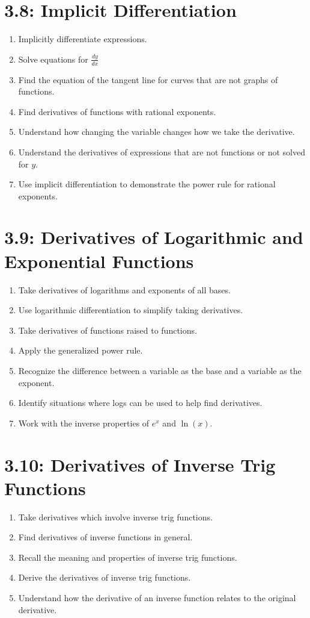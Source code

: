 \section*{3.8: Implicit Differentiation}
\begin{enumerate}
	\item Implicitly differentiate expressions.
	\item Solve equations for $\frac{dy}{dx}$
	\item Find the equation of the tangent line for curves that are not graphs of functions.
	\item Find derivatives of functions with rational exponents.
	\item Understand how changing the variable changes how we take the derivative.
	\item Understand the derivatives of expressions that are not functions or not solved for $y$.
	\item Use implicit differentiation to demonstrate the power rule for rational exponents.
\end{enumerate}

\section*{3.9: Derivatives of Logarithmic and Exponential Functions}
\begin{enumerate}
	\item Take derivatives of logarithms and exponents of all bases.
	\item Use logarithmic differentiation to simplify taking derivatives.
	\item Take derivatives of functions raised to functions.
	\item Apply the generalized power rule.
	\item Recognize the difference between a variable as the base and a variable as the exponent.
	\item Identify situations where logs can be used to help find derivatives.
	\item Work with the inverse properties of $e^x$ and $\ln(x)$.
\end{enumerate}

\section*{3.10: Derivatives of Inverse Trig Functions}
\begin{enumerate}
	\item Take derivatives which involve inverse trig functions.
	\item Find derivatives of inverse functions in general.
	\item Recall the meaning and properties of inverse trig functions.
	\item Derive the derivatives of inverse trig functions.
	\item Understand how the derivative of an inverse function relates to the original derivative.
\end{enumerate}

